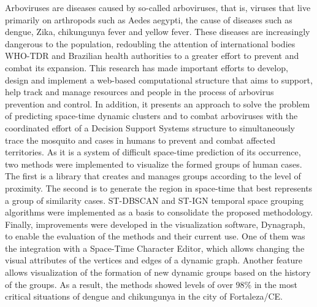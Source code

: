 Arboviruses are diseases caused by so-called arboviruses, that is, viruses that live primarily on arthropods such as Aedes aegypti, the cause of diseases such as dengue, Zika, chikungunya fever and yellow fever. These diseases are increasingly dangerous to the population, redoubling the attention of international bodies WHO-TDR and Brazilian health authorities to a greater effort to prevent and combat its expansion. This research has made important efforts to develop, design and implement a web-based computational structure that aims to support, help track and manage resources and people in the process of arbovirus prevention and control.
In addition, it presents an approach to solve the problem of predicting space-time dynamic clusters and to combat arboviruses with the coordinated effort of a Decision Support Systems structure to simultaneously trace the mosquito and cases in humans to prevent and combat affected territories.
As it is a system of difficult space-time prediction of its occurrence, two methods were implemented to visualize the formed groups of human cases.
The first is a library that creates and manages groups according to the level of proximity.
The second is to generate the region in space-time that best represents a group of similarity cases.
ST-DBSCAN and ST-IGN temporal space grouping algorithms were implemented as a basis to consolidate the proposed methodology. Finally, improvements were developed in the visualization software, Dynagraph, to enable the evaluation of the methods and their current use. One of them was the integration with a Space-Time Character Editor, which allows changing the visual attributes of the vertices and edges of a dynamic graph. Another feature allows visualization of the formation of new dynamic groups based on the history of the groups.
As a result, the methods showed levels of over 98\% in the most critical situations of dengue and chikungunya in the city of Fortaleza/CE.

